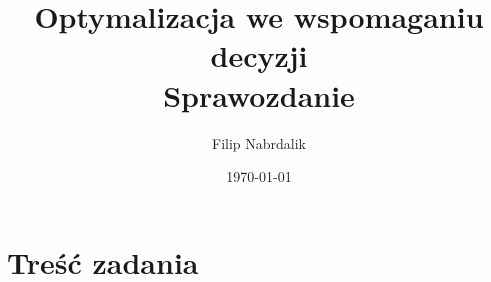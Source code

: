 \documentclass[a4paper, 10pt]{article}
\title{{\bf {Optymalizacja we wspomaganiu decyzji}} \\ {\large Sprawozdanie}}
\date{\today}
\author{Filip Nabrdalik}
\begin{document}




\maketitle 




\newcommand{\ang}[1]{(ang. {\em #1}\/)}
\newcommand{\e}[1]{{\em #1}\/}





\section{Treść zadania}





\nocite{*}
\renewcommand\refname{\section{Bibliografia}}

\end{document}

